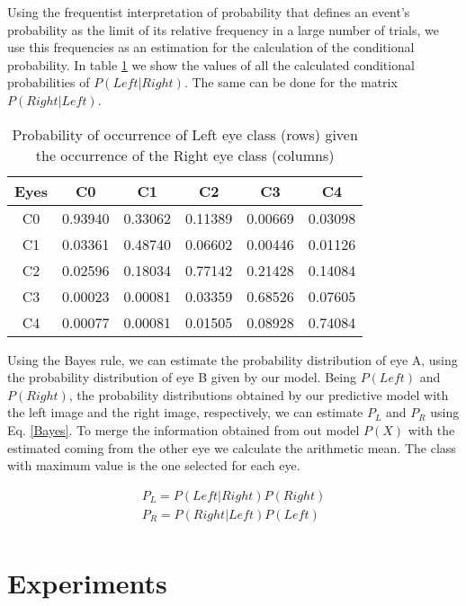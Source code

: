 Using the frequentist interpretation of probability that defines an event's probability as the limit of its relative frequency in a large number of trials, we use this frequencies as an estimation for the calculation of the conditional probability. In table \ref{class:tab:probabilities} we show the values of all the calculated conditional probabilities of $P(Left|Right)$. The same can be done for the matrix $P(Right|Left)$.

\begin{table}[ht!]
	\centering
	\begin{tabular}{c c c c c c} 
		\hline
		Eyes & C0 & C1 & C2 & C3 & C4\\ [0.5ex] 
		\hline\hline
		C0 & 0.93940 & 0.33062 & 0.11389 & 0.00669 & 0.03098\\
		C1 & 0.03361 & 0.48740 & 0.06602 & 0.00446 & 0.01126\\
		C2 & 0.02596 & 0.18034 & 0.77142 & 0.21428 & 0.14084\\
		C3 & 0.00023 & 0.00081 & 0.03359 & 0.68526 & 0.07605\\
		C4 & 0.00077 & 0.00081 & 0.01505 & 0.08928 & 0.74084\\
		\hline
	\end{tabular}
	\caption[Conditional probabilities of occurrence of DR]{Probability of occurrence of Left eye class (rows) given the occurrence of the Right eye class (columns)}
	\label{class:tab:probabilities}
\end{table}

Using the Bayes rule, we can estimate the probability distribution of eye A, using the probability distribution of eye B given by our model. Being $P(Left)$ and $P(Right)$, the probability distributions obtained by our predictive model with the left image and the right image, respectively, we can estimate $P_L$ and $P_R$ using Eq. \ref{Bayes}. To merge the information obtained from out model $P(X)$ with the estimated coming from the other eye we calculate the arithmetic mean. The class with maximum value is the one selected for each eye.

\begin{equation}
\begin{aligned}
P_L = P(Left|Right)P(Right) \\ P_R = P(Right|Left)P(Left)\\
\end{aligned}
\label{Bayes}
\end{equation}

\section{Experiments}


